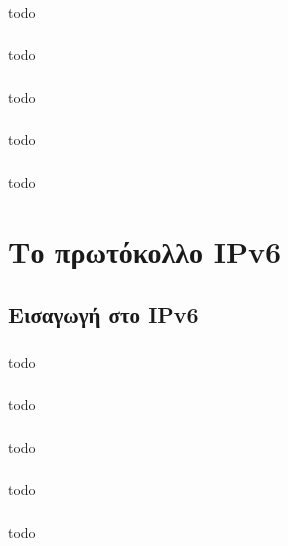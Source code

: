 \documentclass[a4paper, 12pt]{article}
\begin{document}
		\subsubsection{}
			todo

		\subsubsection{}
			todo

		\subsubsection{}
			todo

		\subsubsection{}
			todo

		\subsubsection{}
			todo

\section{Το πρωτόκολλο IPv6}

	\subsection{Εισαγωγή στο IPv6}

		\subsubsection{}
			todo

		\subsubsection{}
			todo

		\subsubsection{}
			todo

		\subsubsection{}
			todo

		\subsubsection{}
			todo
\end{document}
